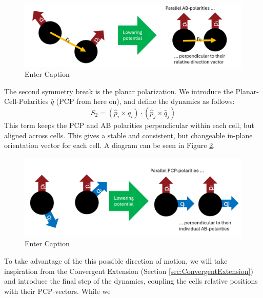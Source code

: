 
\begin{figure}[H]
    \centering
    \includegraphics[width=1\linewidth]{chapters//Theory//figures/explainS1.png}
    \caption{Enter Caption}
    \label{fig:explain-S1}
\end{figure}
The second symmetry break is the planar polarization. We introduce the Planar-Cell-Polarities $\hat{q}$ (PCP from here on), and define the dynamics as follows:
\begin{equation*}
    S_2=\left(\hat{p}_i \times \hat{q}_{i}\right) \cdot\left(\hat{p}_j \times \hat{q}_{j}\right)
\end{equation*}
This term keeps the PCP and AB polarities perpendicular within each cell, but aligned across cells. This gives a stable and consistent, but changeable in-plane orientation vector for each cell. A diagram can be seen in Figure \ref{fig:explain-S2}.\\
\begin{figure}[H]
    \centering
    \includegraphics[width=1\linewidth]{chapters//Theory//figures/explainS2.png}
    \caption{Enter Caption}
    \label{fig:explain-S2}
\end{figure}
To take advantage of the this possible direction of motion, we will take inspiration from the Convergent Extension (Section \ref{sec:ConvergentExtension}) and introduce the final step of the dynamics, coupling the cells relative positions with their PCP-vectors. While we 

